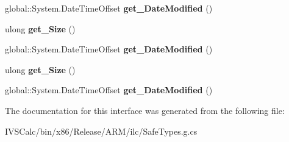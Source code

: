 \begin{DoxyCompactItemize}
global\+::\+System.\+Date\+Time\+Offset {\bfseries get\+\_\+\+Date\+Modified} ()
\item 
\mbox{\label{interface_windows_1_1_storage_1_1_file_properties_1_1_i_basic_properties_a9443d5267265836584c72d9269eefc66}} 
ulong {\bfseries get\+\_\+\+Size} ()
\item 
\mbox{\label{interface_windows_1_1_storage_1_1_file_properties_1_1_i_basic_properties_aa691483ff8606b83e9f1f568782ef91a}} 
global\+::\+System.\+Date\+Time\+Offset {\bfseries get\+\_\+\+Date\+Modified} ()
\item 
\mbox{\label{interface_windows_1_1_storage_1_1_file_properties_1_1_i_basic_properties_a9443d5267265836584c72d9269eefc66}} 
ulong {\bfseries get\+\_\+\+Size} ()
\item 
\mbox{\label{interface_windows_1_1_storage_1_1_file_properties_1_1_i_basic_properties_aa691483ff8606b83e9f1f568782ef91a}} 
global\+::\+System.\+Date\+Time\+Offset {\bfseries get\+\_\+\+Date\+Modified} ()
\end{DoxyCompactItemize}


The documentation for this interface was generated from the following file\+:\begin{DoxyCompactItemize}
\item 
I\+V\+S\+Calc/bin/x86/\+Release/\+A\+R\+M/ilc/Safe\+Types.\+g.\+cs\end{DoxyCompactItemize}
